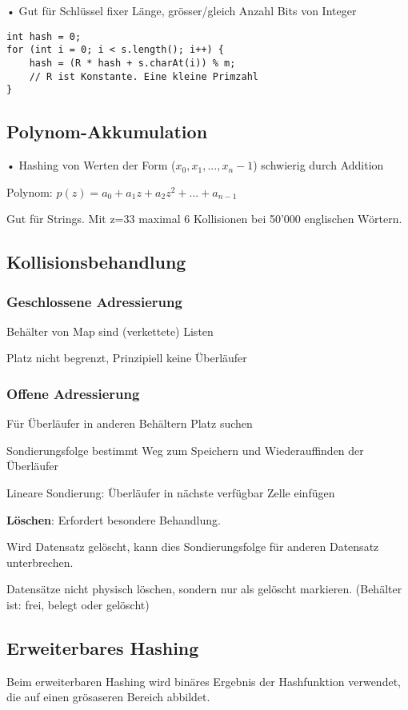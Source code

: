 \begin{multicols*}{4}
		• Gut für Schlüssel fixer Länge, grösser/gleich Anzahl Bits von Integer
		
		\begin{lstlisting}
int hash = 0;
for (int i = 0; i < s.length(); i++) {
	hash = (R * hash + s.charAt(i)) % m;
	// R ist Konstante. Eine kleine Primzahl
}
		\end{lstlisting}	
	
	\subsection{Polynom-Akkumulation}
	• Hashing von Werten der Form ($x_0, x_1 , ..., x_n-1$) schwierig durch Addition
	
	Polynom:
	$p(z) = a_0 + a_1z + a_2z^2 + ... + a_{n-1}$
		
	Gut für Strings. Mit z=33 maximal 6 Kollisionen bei 50'000 englischen Wörtern.
		
	\subsection{Kollisionsbehandlung}
		\subsubsection{Geschlossene Adressierung}
		Behälter von Map sind (verkettete) Listen
		
		Platz nicht begrenzt, Prinzipiell keine Überläufer
		
		\subsubsection{Offene Adressierung}
		Für Überläufer in anderen Behältern Platz suchen
		
		Sondierungsfolge bestimmt Weg zum Speichern und Wiederauffinden der Überläufer
		
		Lineare Sondierung: Überläufer in nächste verfügbar Zelle einfügen
		
		\textbf{Löschen}: Erfordert besondere Behandlung.
		
		Wird Datensatz gelöscht, kann dies Sondierungsfolge für anderen Datensatz unterbrechen.
		
		Datensätze nicht physisch löschen, sondern nur als gelöscht markieren. (Behälter ist: frei, belegt oder gelöscht)
		
	\subsection{Erweiterbares Hashing}
		Beim erweiterbaren Hashing wird binäres Ergebnis der Hashfunktion verwendet, die auf einen grösaseren Bereich abbildet.
		

\end{multicols*}
